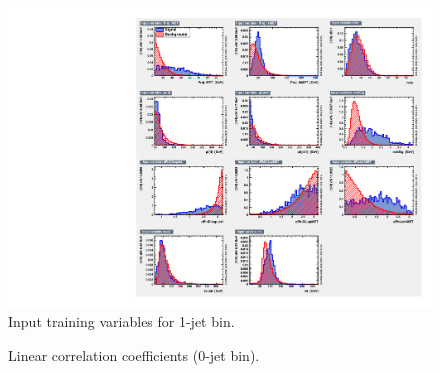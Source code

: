 \begin{figure}[!hbtp]
\begin{center}
\includegraphics[width=.9\textwidth]{figures/TMVAvar_1j.pdf}
\caption{Input training variables for 1-jet bin.}
\label{fig:TMVAvar_1j}
\end{center}
\end{figure}

\begin{figure}[!hbtp]
\begin{center}
\caption{Linear correlation coefficients (0-jet bin).}
\label{fig:lincorr0j}
\end{center}
\end{figure}

